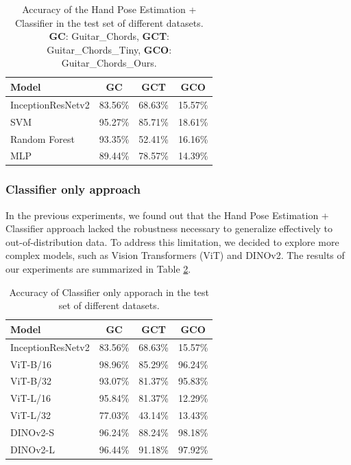 \documentclass[10pt,twocolumn,letterpaper]{article}
\begin{document}

\begin{table}[h]
  \centering
  \begin{tabular}{lccc}
    \toprule
    \textbf{Model} & \textbf{GC} & \textbf{GCT} & \textbf{GCO} \\
    \midrule
 InceptionResNetv2 & 83.56\% & 68.63\% & 15.57\% \\
    \midrule
 SVM & 95.27\% & 85.71\% & 18.61\% \\
 Random Forest & 93.35\% & 52.41\% & 16.16\%  \\
 MLP & 89.44\% & 78.57\% & 14.39\% \\
    \bottomrule
  \end{tabular}
  \caption{Accuracy of the Hand Pose Estimation + Classifier in the test set of different datasets. \textbf{GC}: Guitar\_Chords, \textbf{GCT}: Guitar\_Chords\_Tiny, \textbf{GCO}: Guitar\_Chords\_Ours.}
  \label{tab:handpose-classifier-results}
\end{table}

\subsubsection{Classifier only approach}
In the previous experiments, we found out that the Hand Pose Estimation + Classifier approach lacked the robustness necessary to generalize effectively to out-of-distribution data. To address this limitation, we decided to explore more complex models, such as Vision Transformers (ViT) and DINOv2. The results of our experiments are summarized in Table \ref{tab:transformer-models-results}.

\begin{table}[h]
  \centering
  \begin{tabular}{lccc}
    \toprule
    \textbf{Model} & \textbf{GC} & \textbf{GCT} & \textbf{GCO} \\
    \midrule
    InceptionResNetv2 & 83.56\% & 68.63\% & 15.57\% \\
    \midrule
    ViT-B/16 & 98.96\% & 85.29\% & 96.24\% \\
    ViT-B/32 & 93.07\% & 81.37\% & 95.83\% \\
    ViT-L/16 & 95.84\% & 81.37\% & 12.29\% \\
    ViT-L/32 & 77.03\% & 43.14\% & 13.43\% \\
    DINOv2-S & 96.24\% & 88.24\% & 98.18\% \\
    DINOv2-L & 96.44\% & 91.18\% & 97.92\% \\
    \bottomrule
  \end{tabular}
  \caption{Accuracy of Classifier only apporach in the test set of different datasets.}
  \label{tab:transformer-models-results}
\end{table}
\end{document}
